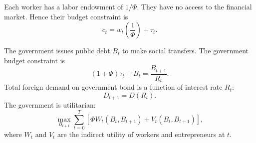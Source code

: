 \documentclass[twoside,11pt,leqno]{article}
\begin{document}
Each worker has a labor endowment of $1/\Phi$. They have no access to the financial market. Hence their budget constraint is
\begin{equation*}
    c_t = w_t \left(\frac{1}{\Phi} \right) + \tau_t.
\end{equation*}

The government issues public debt $B_t$ to make social transfers. The government budget constraint is
\begin{equation*}
    (1+\Phi)\tau_{t} + B_{t} = \frac{B_{t+1}}{R_{t}}.
\end{equation*}
Total foreign demand on government bond is a function of interest rate $R_t$:
\begin{equation*}
    D_{t+1} = D(R_t).
\end{equation*}
The government is utilitarian:
\begin{equation*}
    \max_{B_{t+1}} \sum_{t=0}^T \left[ \Phi W_t(B_t,B_{t+1}) + V_t(B_t,B_{t+1}) \right],
\end{equation*}
where $W_t$ and $V_t$ are the indirect utility of workers and entrepreneurs at $t$.
\end{document}
